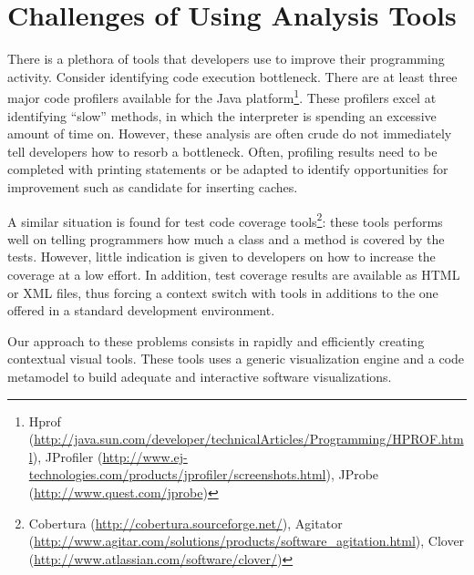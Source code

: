 \documentclass[runningheads]{llncs}
\begin{document}
\section{Challenges of Using Analysis Tools}

There is a plethora of tools that developers use to improve their programming activity. Consider identifying code execution bottleneck. There are at least three major code profilers available for the Java platform\footnote{
Hprof (\url{http://java.sun.com/developer/technicalArticles/Programming/HPROF.html}), 
JProfiler (\url{http://www.ej-technologies.com/products/jprofiler/screenshots.html}), 
JProbe (\url{http://www.quest.com/jprobe})}. These profilers excel at identifying ``slow'' methods, in which the interpreter is spending an excessive amount of time on. However, these analysis are often crude do not immediately tell developers how to resorb a bottleneck. Often, profiling results need to be completed with printing statements or be adapted to identify opportunities for improvement such as candidate for inserting caches.

A similar situation is found for test code coverage tools\footnote{Cobertura (\url{http://cobertura.sourceforge.net/}), Agitator (\url{http://www.agitar.com/solutions/products/software_agitation.html}), Clover (\url{http://www.atlassian.com/software/clover/})}: these tools performs well on telling programmers how much a class and a method is covered by the tests. However, little indication is given to developers on how to increase the coverage at a low effort. In addition, test coverage results are available as HTML or XML files, thus forcing a context switch with tools in additions to the one offered in a standard development environment.



Our approach to these problems consists in rapidly and efficiently creating contextual visual tools. These tools uses a generic visualization engine and a code metamodel to build adequate and interactive software visualizations.

\end{document}
